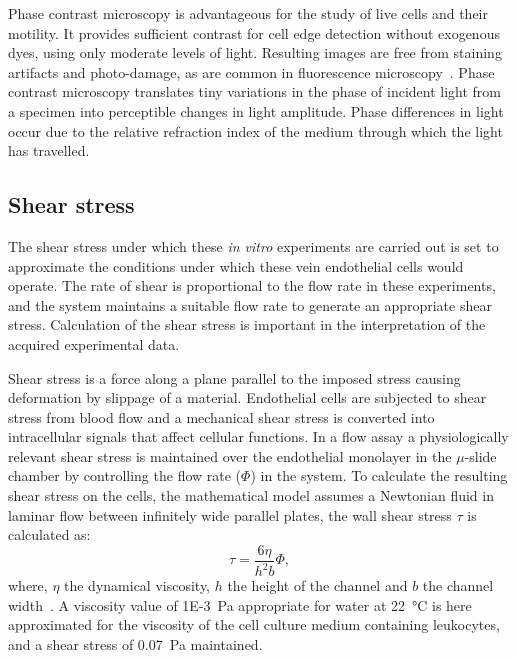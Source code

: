 Phase contrast microscopy is advantageous for the study of live cells and their motility. It provides sufficient contrast for cell edge detection without exogenous dyes, using only moderate levels of light. Resulting images are free from staining artifacts and photo-damage, as are common in fluorescence microscopy~\cite{Ambuhl2012}. Phase contrast microscopy translates tiny variations in the phase of incident light from a specimen into perceptible changes in light amplitude. Phase differences in light occur due to the relative refraction index of the medium through which the light has travelled.

\subsection{Shear stress}
\label{leukocytes:introduction:shear}
The shear stress under which these \emph{in vitro} experiments are carried out is set to approximate the conditions under which these vein endothelial cells would operate. The rate of shear is proportional to the flow rate in these experiments, and the system maintains a suitable flow rate to generate an appropriate shear stress. Calculation of the shear stress is important in the interpretation of the acquired experimental data.

Shear stress is a force along a plane parallel to the imposed stress causing deformation by slippage of a material. Endothelial cells are subjected to shear stress from blood flow and a mechanical shear stress is converted into intracellular signals that affect cellular functions. In a flow assay a physiologically relevant shear stress is maintained over the endothelial monolayer in the $\mu$-slide chamber by controlling the flow rate ($\Phi$) in the system. To calculate the resulting shear stress on the cells, the mathematical model assumes a Newtonian fluid in laminar flow between infinitely wide parallel plates, the wall shear stress $\tau$ is calculated as:
\begin{equation}
	\tau=\frac{6\eta}{h^2b}\Phi,
\end{equation}
where, $\eta$ the dynamical viscosity, $h$ the height of the channel and $b$ the channel width~\cite{Bacabac2005}. A viscosity value of \SI{1E-3}{Pa} appropriate for water at \SI{22}{\degreeCelsius} is here approximated for the viscosity of the cell culture medium containing leukocytes, and a shear stress of \SI{0.07}{\pascal} maintained.

